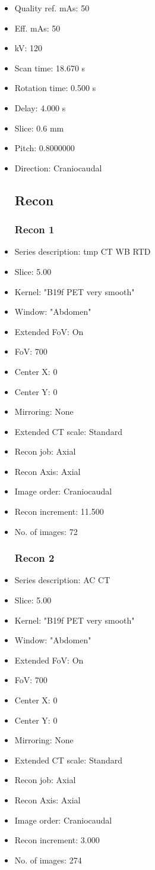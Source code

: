 \documentclass[12pt]{article}
\begin{document}
\begin{itemize}
\subsection{Scan}
\item Quality ref. mAs: 50\item Eff. mAs: 50\item kV: 120\item Scan time: 18.670 s\item Rotation time: 0.500 s\item Delay: 4.000 s\item Slice: 0.6 mm\item Pitch: 0.8000000\item Direction: Craniocaudal
\subsection{Recon}

\subsubsection{Recon 1}
\item Series description: tmp CT WB RTD
\item Slice: 5.00
\item Kernel: "B19f PET very smooth"
\item Window: "Abdomen"
\item Extended FoV: On
\item FoV: 700
\item Center X: 0
\item Center Y: 0
\item Mirroring: None
\item Extended CT scale: Standard
\item Recon job: Axial
\item Recon Axis: Axial
\item Image order: Craniocaudal
\item Recon increment: 11.500
\item No. of images: 72
\subsubsection{Recon 2}
\item Series description: AC CT
\item Slice: 5.00
\item Kernel: "B19f PET very smooth"
\item Window: "Abdomen"
\item Extended FoV: On
\item FoV: 700
\item Center X: 0
\item Center Y: 0
\item Mirroring: None
\item Extended CT scale: Standard
\item Recon job: Axial
\item Recon Axis: Axial
\item Image order: Craniocaudal
\item Recon increment: 3.000
\item No. of images: 274

\end{itemize}
\end{document}
